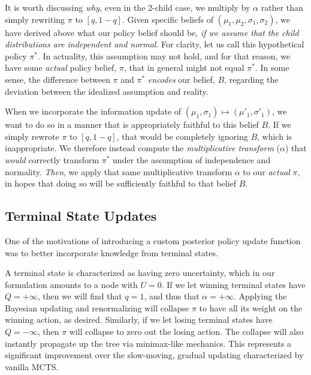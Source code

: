\documentclass[tikz]{article}
\begin{document}
It is worth discussing \emph{why}, even in the 2-child case, we multiply by $\alpha$ rather than simply rewriting $\pi$ to $[q, 1-q]$.
Given specific beliefs of $(\mu_1, \mu_2, \sigma_1, \sigma_2)$, we have derived above what our policy belief should be, \textit{if we assume
that the child distributions are independent and normal}. For clarity, let us call this hypothetical policy $\pi^*$.
In actuality, this assumption may not hold, and for that reason, we have some \textit{actual} policy belief, $\pi$, that in general might not
equal $\pi^*$. In some sense, the difference between $\pi$ and $\pi^*$ \emph{encodes} our belief, $B$, regarding the deviation between
the idealized assumption and reality. \newline

When we incorporate the information update of $(\mu_1, \sigma_1) \mapsto (\mu'_1, \sigma'_1)$, we want to do so in
a manner that is appropriately faithful to this belief $B$. If we simply rewrote $\pi$ to $[q, 1-q]$, that would be completely
ignoring $B$, which is inappropriate. We therefore instead compute the \textit{multiplicative transform} ($\alpha$)
that \textit{would} correctly transform $\pi^*$ under the assumption of independence and normality. \textit{Then}, we apply that same
multiplicative transform $\alpha$ to our \textit{actual} $\pi$, in hopes that doing so will be sufficiently faithful to that
belief $B$.

\subsection{Terminal State Updates}

One of the motivations of introducing a custom posterior policy update function was to better incorporate knowledge from terminal states. \newline

A terminal state is characterized as having zero uncertainty, which in our formulation amounts to a node with $U = 0$. If we let winning
terminal states have $Q = +\infty$, then we will find that $q=1$, and thus that $\alpha = +\infty$. Applying the Bayesian updating and
renormalizing will collapse $\pi$ to have all its weight on the winning action, as desired. Similarly, if we let losing terminal states
have $Q = -\infty$, then $\pi$ will collapse to zero out the losing action. The collapse will also instantly propagate up the tree via
minimax-like mechanics. This represents a significant improvement over the slow-moving, gradual updating characterized by vanilla MCTS. \newline
\end{document}
